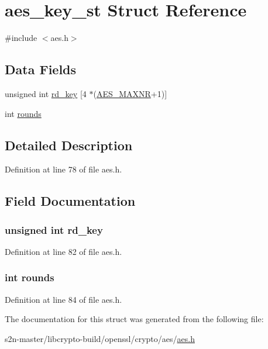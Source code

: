 \hypertarget{structaes__key__st}{}\section{aes\+\_\+key\+\_\+st Struct Reference}
\label{structaes__key__st}


{\ttfamily \#include $<$aes.\+h$>$}

\subsection*{Data Fields}
\begin{DoxyCompactItemize}
\item 
unsigned int \hyperlink{structaes__key__st_a2349888e3c1e362f252dd46380bfb6c6}{rd\+\_\+key} \mbox{[}4 $\ast$(\hyperlink{include_2openssl_2aes_8h_ab517fa1010f3c588859797f1b87c4bcd}{A\+E\+S\+\_\+\+M\+A\+X\+NR}+1)\mbox{]}
\item 
int \hyperlink{structaes__key__st_ab951ebd61b5fff7fb5c4212d7fc63254}{rounds}
\end{DoxyCompactItemize}


\subsection{Detailed Description}


Definition at line 78 of file aes.\+h.



\subsection{Field Documentation}
\subsubsection[{\texorpdfstring{rd\+\_\+key}{rd_key}}]{\setlength{\rightskip}{0pt plus 5cm}unsigned int rd\+\_\+key}\hypertarget{structaes__key__st_a2349888e3c1e362f252dd46380bfb6c6}{}\label{structaes__key__st_a2349888e3c1e362f252dd46380bfb6c6}


Definition at line 82 of file aes.\+h.

\subsubsection[{\texorpdfstring{rounds}{rounds}}]{\setlength{\rightskip}{0pt plus 5cm}int rounds}\hypertarget{structaes__key__st_ab951ebd61b5fff7fb5c4212d7fc63254}{}\label{structaes__key__st_ab951ebd61b5fff7fb5c4212d7fc63254}


Definition at line 84 of file aes.\+h.



The documentation for this struct was generated from the following file\+:\begin{DoxyCompactItemize}
\item 
s2n-\/master/libcrypto-\/build/openssl/crypto/aes/\hyperlink{crypto_2aes_2aes_8h}{aes.\+h}\end{DoxyCompactItemize}
